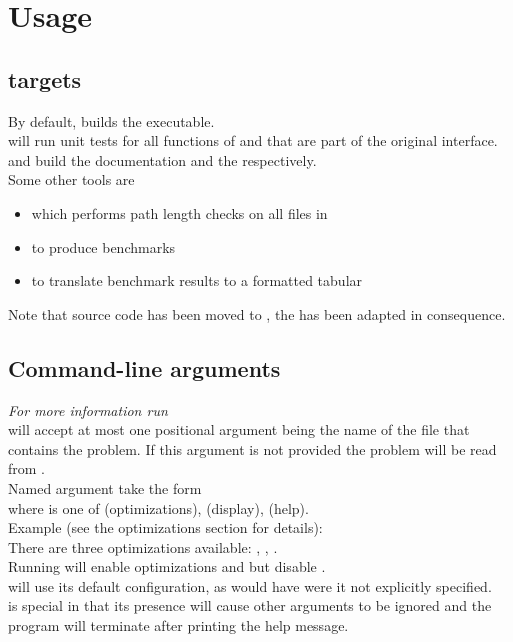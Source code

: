\section{Usage}\label{sec-usage}

\subsection{ targets}

By default,  builds the  executable.\\
 will run unit tests for all functions of
 and  that are part of the original
interface.\\

 and  build the documentation and the
 respectively.\\

Some other tools are
\begin{itemize}
    \item {} which performs path length checks on all files in 
    \item {} to produce benchmarks
    \item {} to translate benchmark results to a formatted tabular
\end{itemize}

Note that source code has been moved to , the  has
been adapted in consequence.

\subsection{Command-line arguments}

\textit{For more information run }\\

 will accept at most one positional argument being the name of the
file that contains the problem. If this argument is not provided the problem will
be read from .\\

Named argument take the form \ttt{-[CATEGORY][FLAGS]}\\
where  is one of  (optimizations),  (display),
 (help).\\

Example (see the optimizations section for details):\\
There are three optimizations available: , , .\\
Running  will enable optimizations  and 
but disable .\\
 will use its default configuration, as would have  were it not
explicitly specified.\\

 is special in that its presence will cause other arguments to be ignored
and the program will terminate after printing the help message.\\


